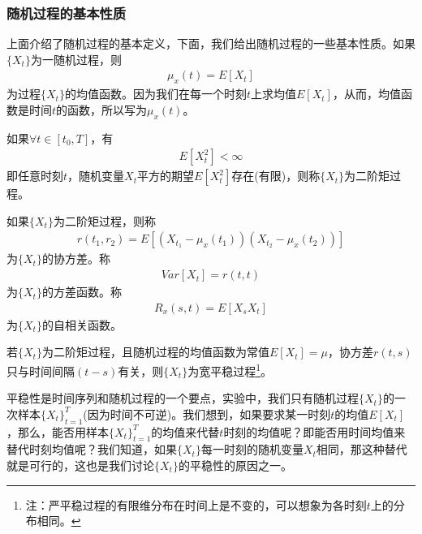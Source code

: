         \subsubsection{随机过程的基本性质}
            \label{subsubsec:随机过程的基本性质}
            \par
            上面介绍了随机过程的基本定义，下面，我们给出随机过程的一些基本性质。如果$\{X_t\}$为一随机过程，则
            \begin{align*}
                \mu_x(t) = E[X_t]
            \end{align*}
            为过程$\{X_t\}$的均值函数。因为我们在每一个时刻$t$上求均值$E[X_t]$，从而，均值函数是时间$t$的函数，所以写为$\mu_x(t)$。
            \par
            如果$\forall t \in [t_0,T]$，有
            \begin{align*}
                E[X_t^2] < \infty
            \end{align*}
            即任意时刻$t$，随机变量$X_t$平方的期望$E[X_t^2]$存在(有限)，则称$\{X_t\}$为二阶矩过程。
            \par
            如果$\{X_t\}$为二阶矩过程，则称
            \begin{align*}
                r(t_1,r_2) = E[(X_{t_1} - \mu_x(t_1)) (X_{t_2} - \mu_x(t_2))]
            \end{align*}
            为$\{X_t\}$的协方差。称
            \begin{align*}
                Var [X_t] = r(t,t)
            \end{align*}
            为$\{X_t\}$的方差函数。称
            \begin{align*}
                R_x(s,t) = E[X_s X_t]
            \end{align*}
            为$\{X_t\}$的自相关函数。
            \begin{definition}[宽平稳过程]
            若$\{X_t\}$为二阶矩过程，且随机过程的均值函数为常值$E[X_t] = \mu$，协方差$r(t,s)$只与时间间隔$(t - s)$有关，则$\{X_t\}$为宽平稳过程\footnote{注：严平稳过程的有限维分布在时间上是不变的，可以想象为各时刻$t$上的分布相同。}。
            \end{definition}
            \par
            平稳性是时间序列和随机过程的一个要点，实验中，我们只有随机过程$\{X_t\}$的一次样本$\{X_t\}_{t = 1}^T$(因为时间不可逆)。我们想到，如果要求某一时刻$t$的均值$E[X_t]$，那么，能否用样本$\{X_t\}_{t = 1}^T$的均值来代替$t$时刻的均值呢？即能否用时间均值来替代时刻均值呢？我们知道，如果$\{X_t\}$每一时刻的随机变量$X_t$相同，那这种替代就是可行的，这也是我们讨论$\{X_t\}$的平稳性的原因之一。
